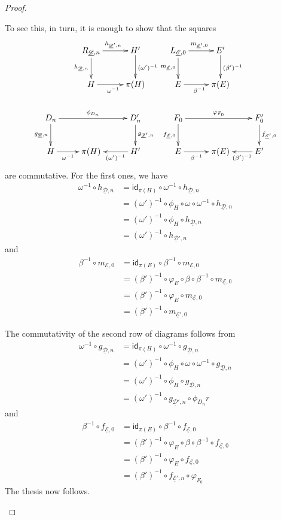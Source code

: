 \documentclass[a4paper,UKenglish,cleveref,pdftex, thm-restate,numberwithinsect]{lipics}
\newcommand{\id}[1]{\mathsf{id}_{#1}}
\def\D{\textbf {\textup{D}}}
\newcommand{\dder}[1]{\mathscr{#1}}
\newcommand{\der}[1]{\underline{\dder{#1}}}
\begin{document}
\begin{proof}
\begin{itemize}
To see this, in turn, it is enough to show that	the squares
\[\xymatrix{&R_{\der{D}, n} \ar[d]_{h_{\der{D}, n}}\ar[r]^{h_{\der{D}', n}} & H' \ar[d]^{(\omega')^{-1}} &L_{\der{E}, 0} \ar[d]_{m_{\der{E}, 0}}\ar[r]^{m_{\der{E}', 0}}& E' \ar[d]^{(\beta')^{-1}}\\&H\ar[r]_{\omega^{-1}} &\pi(H)&E \ar[r]_{\beta^{-1}} & \pi(E)\\D_n \ar[rr]^{\phi_{D_n}} \ar[d]_{g_{\der{D}, n}}&&D'_n \ar[d]^{g_{\der{D}', n}}&F_0 \ar[d]_{f_{\der{E}, 0}} \ar[rr]^{\varphi_{F_0}} && F_0' \ar[d]^{f_{\der{E}', 0}}\\H \ar[r]_-{\omega^{-1}} &\pi(H)&H' \ar[l]^-{(\omega')^{-1}}  &E \ar[r]_-{\beta^{-1}} & \pi(E) & E' \ar[l]^-{(\beta')^{-1}}}\]
are commutative. For the first ones, we have
	\begin{align*} 
	\omega^{-1} \circ h_{\der{D}, n}&=\id{\pi(H)}\circ \omega^{-1} \circ h_{\der{D}, n} \\&=(\omega')^{-1}\circ \phi_H \circ \omega \circ \omega^{-1} \circ h_{\der{D}, n}\\&=(\omega')^{-1}\circ \phi_H  \circ h_{\der{D}, n}\\&=(\omega')^{-1}  \circ h_{\der{D}', n}
\end{align*} 
and
\begin{align*} 
	\beta^{-1} \circ m_{\der{E}, 0}&=\id{\pi(E)}\circ \beta^{-1} \circ m_{\der{E}, 0}\\&=(\beta')^{-1}\circ \varphi_{E} \circ \beta \circ \beta^{-1} \circ m_{\der{E}, 0}\\&=(\beta')^{-1}\circ \varphi_{E}  \circ m_{\der{E}, 0}\\&=(\beta')^{-1}  \circ m_{\der{E}', 0}
\end{align*} 

The commutativity of the second row of diagrams follows from
\begin{align*}
 \omega^{-1} \circ g_{\der{D}, n}&=\id{\pi(H)}\circ \omega^{-1} \circ g_{\der{D}, n}\\&=(\omega')^{-1}\circ \phi_H \circ \omega\circ \omega^{-1} \circ g_{\der{D}, n}\\&=(\omega')^{-1}\circ \phi_H  \circ g_{\der{D}, n}\\&= (\omega')^{-1} \circ g_{\der{D}', n}\circ \phi_{D_n}
r\end{align*}
and
\begin{align*}
	\beta^{-1} \circ f_{\der{E}, 0}&=\id{\pi(E)}\circ \beta^{-1} \circ f_{\der{E}, 0}\\&=(\beta')^{-1}\circ \varphi_E \circ \beta\circ \beta^{-1} \circ f_{\der{E}, 0}\\&=(\beta')^{-1}\circ \varphi_E  \circ f_{\der{E}, 0}\\&= (\beta')^{-1} \circ f_{\der{E}', n}\circ \varphi_{F_0}
\end{align*}
 The thesis now follows.	\qedhere 
\end{itemize}	
\end{proof}
\end{document}
